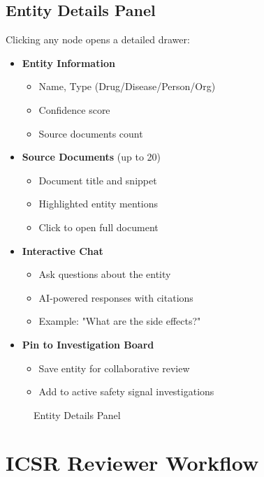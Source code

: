 \subsection{Entity Details Panel}

Clicking any node opens a detailed drawer:

\begin{itemize}
    \item \textbf{Entity Information}
    \begin{itemize}
        \item Name, Type (Drug/Disease/Person/Org)
        \item Confidence score
        \item Source documents count
    \end{itemize}
    \item \textbf{Source Documents} (up to 20)
    \begin{itemize}
        \item Document title and snippet
        \item Highlighted entity mentions
        \item Click to open full document
    \end{itemize}
    \item \textbf{Interactive Chat}
    \begin{itemize}
        \item Ask questions about the entity
        \item AI-powered responses with citations
        \item Example: "What are the side effects?"
    \end{itemize}
    \item \textbf{Pin to Investigation Board}
    \begin{itemize}
        \item Save entity for collaborative review
        \item Add to active safety signal investigations
    \end{itemize}
\end{itemize}

\begin{figure}[h]
\centering
{}
\caption{Entity Details Panel}
\label{fig:entity-drawer}
\end{figure}

\section{ICSR Reviewer Workflow}


